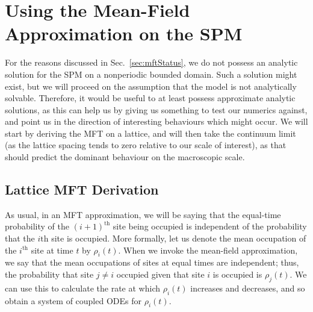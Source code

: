 \section{Using the Mean-Field Approximation on the SPM}
For the reasons discussed in Sec.~\ref{sec:mftStatus}, we do not possess an analytic solution for the SPM on a nonperiodic bounded domain. Such a solution might exist, but
we will proceed on the assumption that the model is not analytically solvable. Therefore, it would be useful to at least possess approximate analytic solutions, as this can help us by giving us
something to test our numerics against, and point us in the direction of interesting behaviours which might occur. We will start by deriving the MFT on a lattice, and will then take the continuum limit (as the lattice spacing tends to zero
relative to our scale of interest), as that should predict the dominant behaviour on the macroscopic scale.


\subsection{Lattice MFT Derivation} 
\label{sec:latticeMFT}
As usual, in an MFT approximation, we will be saying that the equal-time probability of the $(i+1)^\mathrm{th}$ site being occupied is independent of the probability that the $i\mathrm{th}$ site is occupied.
More formally, let us denote the mean occupation of the $i^\mathrm{th}$ site at time $t$ by $\rho_i (t)$. When we invoke the mean-field approximation, we say that the mean occupations of sites at equal times are independent; thus,
the probability that site $j \ne i$ occupied given that site $i$ is occupied is $\rho_j (t)$. We can use this to calculate the rate at which $\rho_i (t)$ increases and decreases, and so obtain a system of coupled ODEs for $\rho_i (t)$.

